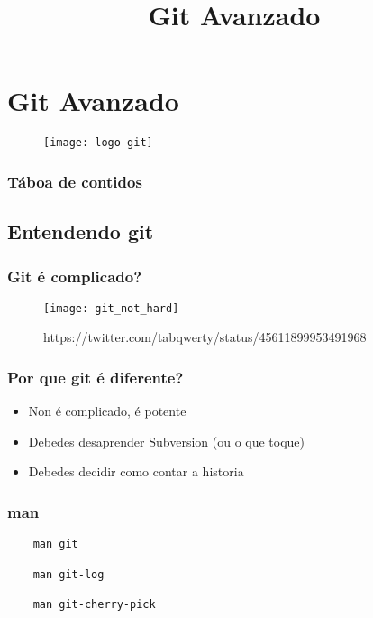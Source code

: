 
\title[Git Avanzado]{Git Avanzado}
\date{}
\author[Pepe Doval]{}
\institute{}

\section{Git Avanzado}
\label{sec:GitAvanzado}


\begin{frame}
  \titlepage
  \begin{figure}[ht]
    \centering
    \texttt{[image: logo-git]}
  \end{figure}
\end{frame}

\begin{frame}
  \frametitle{Táboa de contidos}
  \tableofcontents[currentsection]
\end{frame}


\subsection{Entendendo git}
\label{subsec:Entendendo}

\begin{frame}
  \frametitle{Git é complicado?}
  \begin{figure}[ht]
    \texttt{[image: git\_not\_hard]}
    \caption{https://twitter.com/tabqwerty/status/45611899953491968}
  \end{figure}
\end{frame}

\begin{frame}
  \frametitle{Por que git é diferente?}
  \begin{itemize}
    \item Non é complicado, é potente
    \item Debedes desaprender Subversion (ou o que toque)
    \item Debedes decidir como contar a historia
  \end{itemize}
\end{frame}

\begin{frame}[fragile]
  \frametitle{man}
\begin{verbatim}
	man git

	man git-log

	man git-cherry-pick
\end{verbatim}
\end{frame}

